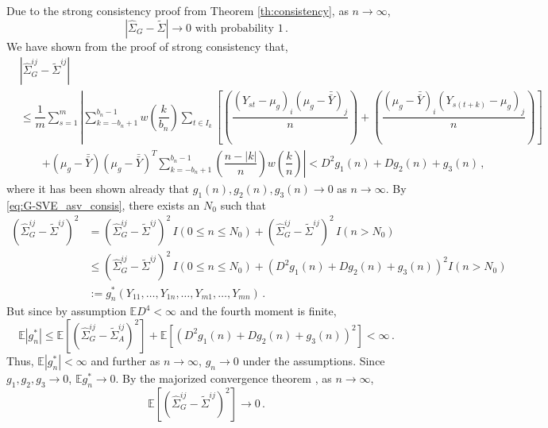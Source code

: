 \documentclass[11pt]{article}
\newcommand{\E}{\mathbb{E}}
\theoremstyle{remark}
\begin{document}
 Due to the strong consistency proof from Theorem \ref{th:consistency}, as $n \to \infty$,
\begin{equation}
\label{eq:G-SVE_asv_consis}
 \left|\hat{\Sigma}_{G} -  \tilde{\Sigma}\right| \to 0 \text{ with probability 1}\,. 
\end{equation}
We have shown from the proof of strong consistency that,
\begin{align*}
 &\left| \hat{\Sigma}_{G}^{ij} - \tilde{\Sigma}^{ij} \right|\\
 & \leq \dfrac{1}{m} \sum_{s=1}^m \left| \sum_{k=-b_n+1}^{b_n-1} w \left(\dfrac{k}{b_n} \right) \sum_{t \in I_k}   \left[ \left( \dfrac{(Y_{st} - \mu_g)_i(\mu_g-\bar{\bar{Y}})_j}{n}\right)+ \left(\dfrac{(\mu_g-\bar{\bar{Y}})_i(Y_{s(t+k)}-\mu_g)_j}{n}\right) \right] \right.\\
& \quad \quad  \left. + (\mu_g-\bar{\bar{Y}})(\mu_g-\bar{\bar{Y}})^T\sum_{k=-b_n+1}^{b_n-1}\left(\dfrac{n-|k|}{n}\right)w\left(\dfrac{k}{n}\right) \right|  < D^2g_1(n) + Dg_2(n) + g_3(n)\,,
\end{align*}
where it has been shown already that $g_1(n), g_2(n), g_3(n) \to 0$ as $n \to \infty$. By \eqref{eq:G-SVE_asv_consis}, there exists an $N_0$ such that
\begin{align*}
\left(\hat{\Sigma}_{G}^{ij} - \tilde{\Sigma}^{ij} \right)^2 &= \left(\hat{\Sigma}_{G}^{ij} - \tilde{\Sigma}^{ij} \right)^2 \, I(0 \leq n \leq N_0) + \left(\hat{\Sigma}_{G}^{ij} - \tilde{\Sigma}^{ij} \right)^2 \, I(n > N_0)\\
& \leq \left(\hat{\Sigma}_{G}^{ij} - \tilde{\Sigma}^{ij} \right)^2 \, I(0 \leq n \leq N_0) +  \left(D^2g_1(n) + Dg_2(n) + g_3(n) \right)^2 I(n > N_0)\\
& := g_n^*(Y_{11}, \dots, Y_{1n}, \dots, Y_{m1}, \dots, Y_{mn})\,.
\end{align*}
But since by assumption $\E D^4 <\infty$ and the fourth moment is finite,
\[
\E \left| g_n^* \right| \leq  \E \left[\left(\hat{\Sigma}_{G}^{ij} - \tilde{\Sigma}_{A}^{ij} \right)^2 \right] + \E \left[\left(D^2g_1(n) + Dg_2(n) + g_3(n) \right)^2 \right] < \infty\,.
\]
Thus, $\E \left| g_n^* \right| < \infty$ and further as $n \to \infty$, $g_n \to 0$ under the assumptions. Since $g_1, g_2, g_3 \to 0$, $\E g_n^* \to 0$. By the majorized convergence theorem \citep{zeid:2013}, as $n \to \infty$,
\begin{equation}
\label{eq:squared_mean_diff}
  \E \left[\left(\hat{\Sigma}_{G}^{ij} - \tilde{\Sigma}^{ij} \right)^2 \right] \to 0\,.
\end{equation}
\end{document}
